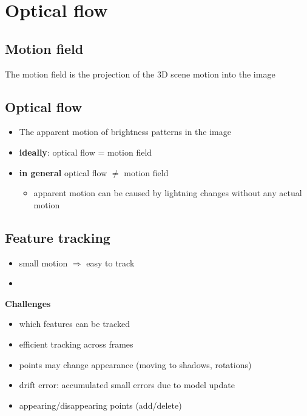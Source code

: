 \documentclass[12pt]{article}
\begin{document}
	\section{Optical flow}
	
	\subsection{Motion field}
	The motion field is the projection of the 3D scene motion into the image
	
	\subsection{Optical flow}
	\begin{itemize}
		\item The apparent motion of brightness patterns in the image
		\item \textbf{ideally}: optical flow = motion field
		\item \textbf{in general} optical flow $\neq$ motion field
			\begin{itemize}
				\item apparent motion can be caused by lightning changes without any actual motion
			\end{itemize}
	\end{itemize}
	
	\subsection{Feature tracking}
	\begin{itemize}
		\item small motion $\Rightarrow$ easy to track
		\item 
	\end{itemize}

	\textbf{Challenges}
	\begin{itemize}
		\item which features can be tracked
		\item efficient tracking across frames
		\item points may change appearance (moving to shadows, rotations)
		\item drift error: accumulated small errors due to model update
		\item appearing/disappearing points (add/delete)
	\end{itemize}
\end{document}
